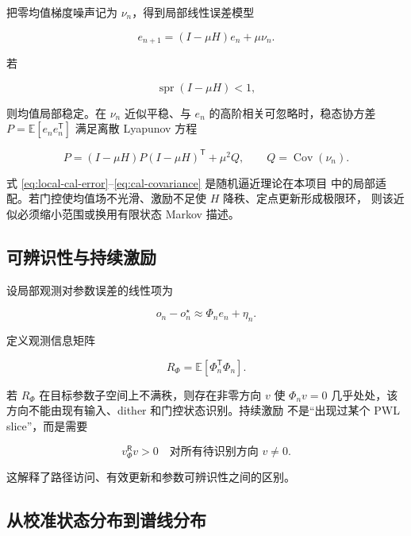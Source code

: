 \documentclass[11pt,a4paper]{ctexart}
\newcommand{\E}{\mathbb{E}}
\newcommand{\Cov}{\operatorname{Cov}}
\newcommand{\spr}{\operatorname{spr}}
\theoremstyle{adcplain}
\theoremstyle{definition}
\begin{document}
把零均值梯度噪声记为 $\nu_n$，得到局部线性误差模型

\begin{equation}
  e_{n+1}
  =
  (I-\mu H)e_n+\mu\nu_n.
  \label{eq:local-cal-error}
\end{equation}

若

\begin{equation}
  \spr(I-\mu H)<1,
  \label{eq:mean-stability}
\end{equation}

则均值局部稳定。在 $\nu_n$ 近似平稳、与 $e_n$ 的高阶相关可忽略时，稳态协方差
$P=\E[e_ne_n^\mathsf T]$ 满足离散 Lyapunov 方程

\begin{equation}
  P
  =
  (I-\mu H)P(I-\mu H)^\mathsf T
  +\mu^2Q,
  \qquad
  Q=\Cov(\nu_n).
  \label{eq:cal-covariance}
\end{equation}

式 \eqref{eq:local-cal-error}--\eqref{eq:cal-covariance} 是随机逼近理论在本项目
中的局部适配。若门控使均值场不光滑、激励不足使 $H$ 降秩、定点更新形成极限环，
则该近似必须缩小范围或换用有限状态 Markov 描述。

\subsection{可辨识性与持续激励}

设局部观测对参数误差的线性项为

\begin{equation}
  o_n-o_n^\star
  \approx
  \Phi_n e_n+\eta_n.
\end{equation}

定义观测信息矩阵

\begin{equation}
  R_\Phi=\E[\Phi_n^\mathsf T\Phi_n].
\end{equation}

若 $R_\Phi$ 在目标参数子空间上不满秩，则存在非零方向 $v$ 使
$\Phi_nv=0$ 几乎处处，该方向不能由现有输入、dither 和门控状态识别。持续激励
不是“出现过某个 PWL slice”，而是需要

\begin{equation}
  v^\mathsf R_\Phi v>0
  \quad
  \text{对所有待识别方向 }v\ne0.
  \label{eq:persistent-excitation}
\end{equation}

这解释了路径访问、有效更新和参数可辨识性之间的区别。

\subsection{从校准状态分布到谱线分布}
\end{document}
